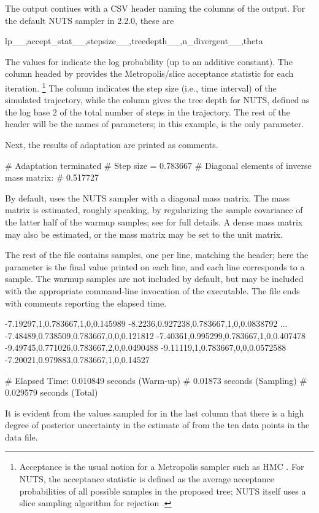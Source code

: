 \documentclass[article]{jss}
\begin{document}
The output contiues with a CSV header naming the columns of the
output. For the default NUTS sampler in  2.2.0, these are
%
\begin{Code}
lp__,accept_stat__,stepsize__,treedepth__,n_divergent__,theta
\end{Code}
%
The values for  indicate the log probability (up to an
additive constant).  The column headed by 
provides the Metropolis/slice acceptance statistic for each
iteration.%
%
\footnote{Acceptance is the usual notion for a Metropolis sampler such
  as HMC \citep{MetropolisEtAl:1953}.  For NUTS, the acceptance
  statistic is defined as the average acceptance probabilities of all
  possible samples in the proposed tree; NUTS itself uses a slice
  sampling algorithm for rejection \citep{Neal:2003, HoffmanGelman:2011}.}
%
The column  indicates the step size
(i.e., time interval) of the simulated trajectory, while the column 
 gives the tree depth for NUTS, defined as the 
log base 2 of the total number of steps in the trajectory.
The rest of the header will be the names of parameters; in this
example,  is the only parameter.

Next, the results of adaptation are printed as comments.
%
\begin{Code}
# Adaptation terminated
# Step size = 0.783667
# Diagonal elements of inverse mass matrix:
# 0.517727
\end{Code}
%
By default,  uses the NUTS sampler with a diagonal mass
matrix.  The mass matrix is estimated, roughly speaking, by
regularizing the sample covariance of the latter half of the warmup
samples; see \citep{Stan:2013} for full details.  A dense mass matrix
may also be estimated, or the mass matrix may be set to the unit matrix.

The rest of the file contains samples, one per line, matching the
header; here the parameter  is the final value printed on
each line, and each line corresponds to a sample.  The warmup samples
are not included by default, but may be included with the appropriate
command-line invocation of the executable. The file ends with comments reporting the elapsed time.
%
\begin{Code}
-7.19297,1,0.783667,1,0,0.145989
-8.2236,0.927238,0.783667,1,0,0.0838792
...
-7.48489,0.738509,0.783667,0,0,0.121812
-7.40361,0.995299,0.783667,1,0,0.407478
-9.49745,0.771026,0.783667,2,0,0.0490488
-9.11119,1,0.783667,0,0,0.0572588
-7.20021,0.979883,0.783667,1,0,0.14527

#  Elapsed Time: 0.010849 seconds (Warm-up)
#                0.01873 seconds (Sampling)
#                0.029579 seconds (Total)
\end{Code}
%
It is evident from the values sampled for  in the last
column that there is a high degree of posterior uncertainty in the
estimate of  from the ten data points in the data file.
\end{document}
